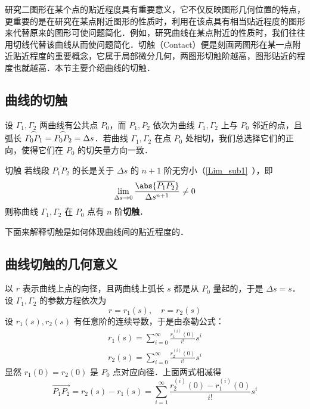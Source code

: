 
研究二图形在某个点的贴近程度具有重要意义，它不仅反映图形几何位置的特点，更重要的是在研究在某点附近图形的性质时，利用在该点具有相当贴近程度的图形来代替原来的图形可使问题简化．例如，研究曲线在某点附近的性质时，我们往往用切线代替该曲线从而使问题简化．切触（Contact）便是刻画两图形在某一点附近贴近程度的重要概念，它属于局部微分几何，两图形切触阶越高，图形贴近的程度也就越高．本节主要介绍曲线的切触．
\subsection{曲线的切触}
设 $\Gamma_1,\Gamma_2$ 两曲线有公共点 $P_0$，而 $P_1,P_2$ 依次为曲线 $\Gamma_1,\Gamma_2$ 上与 $P_0$ 邻近的点，且弧长 $\overset{\Huge\frown}{P_0P_1}=\overset{\Huge\frown}{P_0P_2}=\Delta s$．若曲线  $\Gamma_1,\Gamma_2$ 在点 $P_0$ 处相切，我们总选择它们的正向，使得它们在 $P_0$ 的切矢量方向一致．
\begin{definition}{切触}
若线段 $\overline{P_1P_2}$ 的长是关于 $\Delta s$ 的 $n+1$ 阶无穷小（\autoref{Lim_sub1}~），即
\begin{equation}
\lim_{\Delta s\rightarrow0}\frac{\abs{\overline{P_1P_2}}}{\Delta s^{n+1}}\neq0
\end{equation}
则称曲线 $\Gamma_1,\Gamma_2$ 在 $P_0$ 点有 $n$ 阶\textbf{切触}．
\end{definition}
下面来解释切触是如何体现曲线间的贴近程度的．
\subsection{曲线切触的几何意义}
以 $r$ 表示曲线上点的向径，且两曲线上弧长 $s$ 都是从 $P_0$ 量起的，于是 $\Delta s=s$．设 $\Gamma_1,\Gamma_2$ 的参数方程依次为
\begin{equation}
r=r_1(s),\quad r=r_2(s)
\end{equation}
设 $r_1(s),r_2(s)$ 有任意阶的连续导数，于是由泰勒公式：
\begin{equation}
\begin{aligned}
r_1(s)=\sum_{i=0}^\infty \frac{r^{(i)}_1(0)}{i!}s^i\\
r_2(s)=\sum_{i=0}^\infty \frac{r^{(i)}_2(0)}{i!}s^i
\end{aligned}
\end{equation}
显然 $r_1(0)=r_2(0)$ 是 $P_0$ 点对应向径．上面两式相减得
\begin{equation}
\overrightarrow{P_1P_2}=r_2(s)-r_1(s)=\sum_{i=1}^\infty \frac{r^{(i)}_2(0)-r^{(i)}_1(0)}{i!}s^i
\end{equation}
